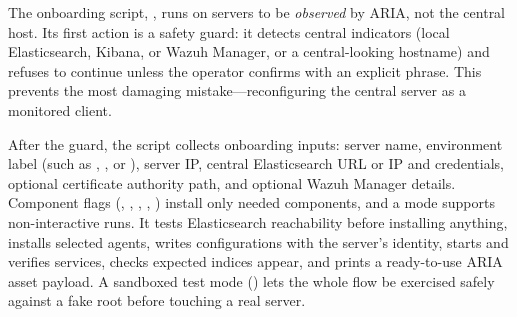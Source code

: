 The onboarding script, , runs on servers to be \emph{observed} by ARIA, not the central host. Its first action is a safety guard: it detects central indicators (local Elasticsearch, Kibana, or Wazuh Manager, or a central-looking hostname) and refuses to continue unless the operator confirms with an explicit phrase. This prevents the most damaging mistake---reconfiguring the central server as a monitored client.

After the guard, the script collects onboarding inputs: server name, environment label (such as , , or ), server IP, central Elasticsearch URL or IP and credentials, optional certificate authority path, and optional Wazuh Manager details. Component flags (, , , , ) install only needed components, and a  mode supports non-interactive runs. It tests Elasticsearch reachability before installing anything, installs selected agents, writes configurations with the server's identity, starts and verifies services, checks expected indices appear, and prints a ready-to-use ARIA asset payload. A sandboxed test mode () lets the whole flow be exercised safely against a fake root before touching a real server.

